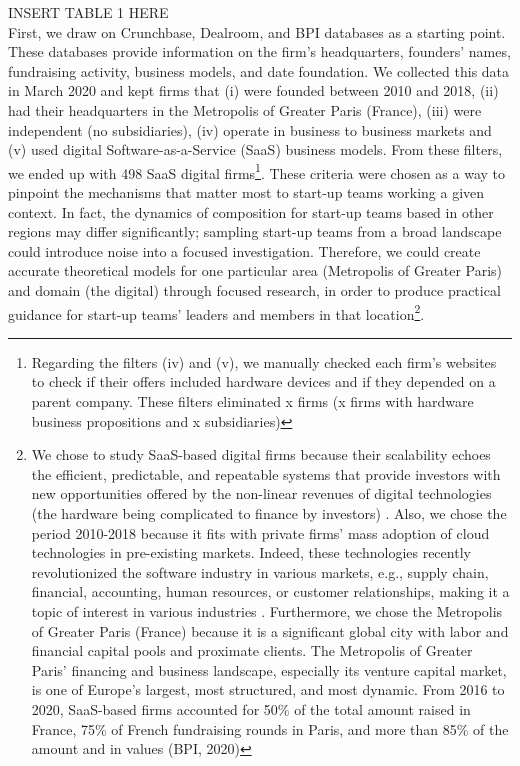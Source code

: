 \documentclass[12pt]{article}
\begin{document}
INSERT TABLE 1 HERE \\

First, we draw on Crunchbase, Dealroom, and BPI databases as a starting point. These databases provide information on the firm's headquarters, founders' names, fundraising activity, business models, and date foundation. We collected this data in March 2020 and kept firms that (i) were founded between 2010 and 2018, (ii) had their headquarters in the Metropolis of Greater Paris (France), (iii) were independent (no subsidiaries), (iv) operate in business to business markets and (v) used digital Software-as-a-Service (SaaS) business models. From these filters, we ended up with 498 SaaS digital firms\footnote{Regarding the filters (iv) and (v), we manually checked each firm's websites to check if their offers included hardware devices and if they depended on a parent company. These filters eliminated x firms (x firms with hardware business propositions and x subsidiaries)}. These criteria were chosen as a way to pinpoint the mechanisms that matter most to start-up teams working a given context. In fact, the dynamics of composition for start-up teams based in other regions may differ significantly; sampling start-up teams from a broad landscape could introduce noise into a focused investigation. Therefore, we could create accurate theoretical models for one particular area (Metropolis of Greater Paris) and domain (the digital) through focused research, in order to produce practical guidance for start-up teams' leaders and members in that location\footnote{We chose to study SaaS-based digital firms because their scalability echoes the efficient, predictable, and repeatable systems that provide investors with new opportunities offered by the non-linear revenues of digital technologies (the hardware being complicated to finance by investors) \citep{nambisan2017digital}. Also, we chose the period 2010-2018 because it fits with private firms' mass adoption of cloud technologies in pre-existing markets. Indeed, these technologies recently revolutionized the software industry in various markets, e.g., supply chain, financial, accounting, human resources, or customer relationships, making it a topic of interest in various industries \citep{luoma2018exploring}. Furthermore, we chose the Metropolis of Greater Paris (France) because it is a significant global city with labor and financial capital pools and proximate clients. The Metropolis of Greater Paris' financing and business landscape, especially its venture capital market, is one of Europe's largest, most structured, and most dynamic. From 2016 to 2020, SaaS-based firms accounted for 50\% of the total amount raised in France, 75\% of French fundraising rounds in Paris, and more than 85\% of the amount and in values (BPI, 2020)}. \\
\end{document}
